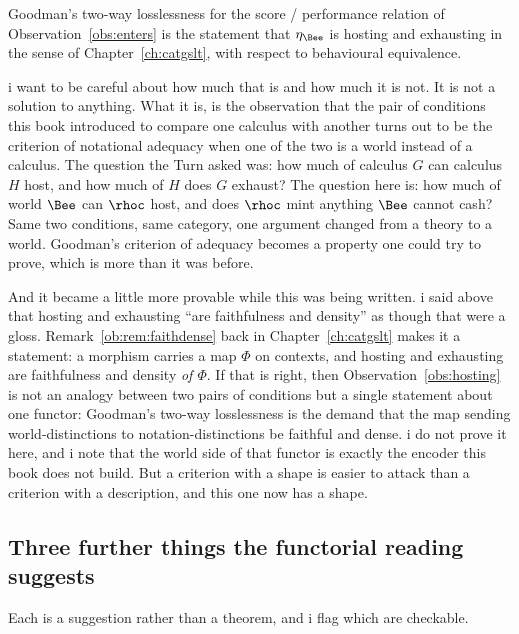 \begin{observation}
\label{obs:hosting}
Goodman's two-way losslessness for the score / performance relation
of Observation~\ref{obs:enters} is the statement that $\eta_{\Bee}$
is hosting and exhausting in the sense of
Chapter~\ref{ch:catgslt}, with respect to behavioural equivalence.
\end{observation}

\noindent
i want to be careful about how much that is and how much it is not.
It is not a solution to anything.
What it is, is the observation that the pair of conditions this
book introduced to compare one calculus with another turns out to
be the criterion of notational adequacy when one of the two is a
world instead of a calculus.
The question the Turn asked was: how much of calculus $G$ can
calculus $H$ host, and how much of $H$ does $G$ exhaust?
The question here is: how much of world $\Bee$ can $\rhoc$ host,
and does $\rhoc$ mint anything $\Bee$ cannot cash?
Same two conditions, same category, one argument changed from a
theory to a world.
Goodman's criterion of adequacy becomes a property one could try to
prove, which is more than it was before.

And it became a little more provable while this was being written.
i said above that hosting and exhausting ``are faithfulness and
density'' as though that were a gloss.
Remark~\ref{ob:rem:faithdense} back in Chapter~\ref{ch:catgslt} makes
it a statement: a morphism carries a map $\Phi$ on contexts, and
hosting and exhausting are faithfulness and density \emph{of $\Phi$}.
If that is right, then Observation~\ref{obs:hosting} is not an
analogy between two pairs of conditions but a single statement about
one functor: Goodman's two-way losslessness is the demand that the
map sending world-distinctions to notation-distinctions be faithful
and dense.
i do not prove it here, and i note that the world side of that
functor is exactly the encoder this book does not build.
But a criterion with a shape is easier to attack than a criterion
with a description, and this one now has a shape.

\subsection{Three further things the functorial reading suggests}
\label{sec:suggests}

Each is a suggestion rather than a theorem, and i flag which are
checkable.

